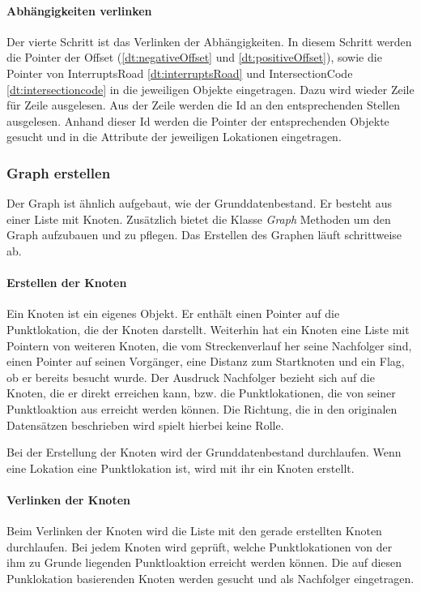\documentclass[12pt, a4paper, ngerman]{article}
\begin{document}
\paragraph{Abhängigkeiten verlinken} 
Der vierte Schritt ist das Verlinken der Abhängigkeiten. In diesem Schritt werden die Pointer der Offset (\ref{dt:negativeOffset} und \ref{dt:positiveOffset}), sowie die Pointer von InterruptsRoad \ref{dt:interruptsRoad} und IntersectionCode \ref{dt:intersectioncode} in die jeweiligen Objekte eingetragen. Dazu wird wieder Zeile für Zeile ausgelesen. Aus der Zeile werden die Id an den entsprechenden Stellen ausgelesen. Anhand dieser Id werden die Pointer der entsprechenden Objekte gesucht und in die Attribute der jeweiligen Lokationen eingetragen.

\subsubsection{Graph erstellen}
Der Graph ist ähnlich aufgebaut, wie der Grunddatenbestand. Er besteht aus einer Liste mit Knoten. Zusätzlich bietet die Klasse \textit{Graph}  Methoden um den Graph aufzubauen und zu pflegen. Das Erstellen des Graphen läuft schrittweise ab.

\paragraph{Erstellen der Knoten \label{knotenErstellen}}
Ein Knoten ist ein eigenes Objekt. Er enthält einen Pointer auf die Punktlokation, die der Knoten darstellt. Weiterhin hat ein Knoten eine Liste mit Pointern von weiteren Knoten, die vom Streckenverlauf her seine Nachfolger sind, einen Pointer auf seinen Vorgänger, eine Distanz zum Startknoten und ein Flag, ob er bereits besucht wurde. Der Ausdruck Nachfolger bezieht sich auf die Knoten, die er direkt erreichen kann, bzw. die Punktlokationen, die von seiner Punktloaktion aus erreicht werden können. Die Richtung, die in den originalen Datensätzen beschrieben wird spielt hierbei keine Rolle.

Bei der Erstellung der Knoten wird der Grunddatenbestand durchlaufen. Wenn eine Lokation eine Punktlokation ist, wird mit ihr ein Knoten erstellt. 

\paragraph{Verlinken der Knoten} 
Beim Verlinken der Knoten wird die Liste mit den gerade erstellten Knoten durchlaufen. Bei jedem Knoten wird geprüft, welche Punktlokationen von der ihm zu Grunde liegenden Punktloaktion erreicht werden können. Die auf diesen Punklokation basierenden Knoten werden gesucht und als Nachfolger eingetragen.
\end{document}
